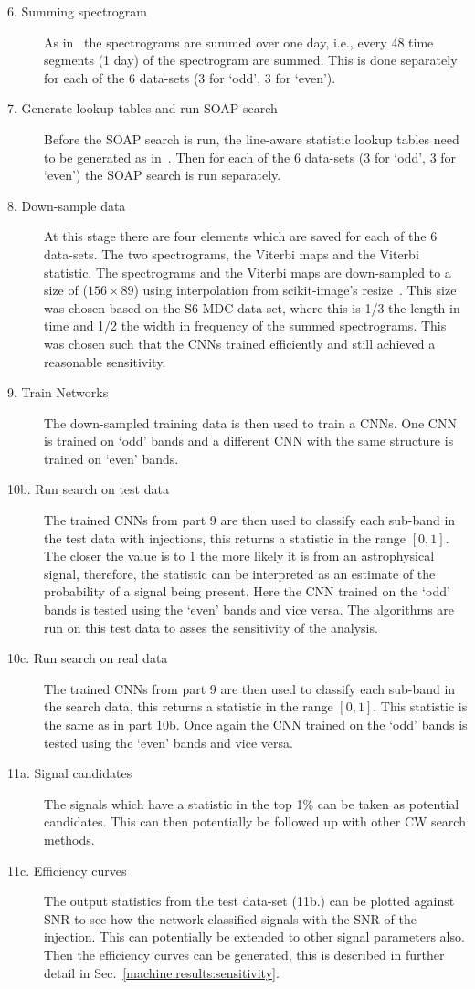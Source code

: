 \begin{description}
	\item[6. Summing spectrogram] As in~\cite{bayley2019SOAPGeneralised} the
	spectrograms are summed over one day, i.e., every 48 time segments (1 day) of
	the spectrogram are summed. This is done separately for each of the 6 data-sets
	(3 for `odd', 3 for `even'). 
	\item[7. Generate lookup tables and run SOAP search] Before the SOAP search is
	run, the line-aware statistic lookup tables need to be generated as
	in~\cite{bayley2019SOAPGeneralised}. Then for each of the 6 data-sets (3 for
	`odd', 3 for `even') the SOAP search is run separately. 
	\item[8. Down-sample data] At this stage there are four elements which are
	saved for each of the 6 data-sets. The two spectrograms, the Viterbi maps and
	the Viterbi statistic. The spectrograms and the Viterbi maps are down-sampled
	to a size of ($156\times 89$) using interpolation from scikit-image's
	resize~\cite{vanderwalt2014ScikitimageImage}. This size was chosen based on the
	S6 \gls{MDC} data-set, where this is 1/3 the length in time and 1/2 the width in
	frequency of the summed spectrograms. 
	This was chosen such that the \glspl{CNN} trained efficiently and still achieved a reasonable sensitivity. 
	\item[9. Train Networks] The down-sampled training data is then used to train a
	\glspl{CNN}. One \gls{CNN} is trained on `odd' bands and a different \gls{CNN} with
	the same structure is trained on `even' bands. 
	\item[10b. Run search on test data] The trained \glspl{CNN} from part 9 are then
	used to classify each sub-band in the test data with injections, this returns a
	statistic in the range $[0,1]$. The closer the value is to 1 the more likely it is from an astrophysical signal, therefore,  the statistic can be interpreted as an estimate of the probability of a signal being present. Here the \gls{CNN}
	trained on the `odd' bands is tested using the `even' bands and vice
	versa. The algorithms are run on this test data to asses the sensitivity of the analysis.
	\item[10c. Run search on real data] The trained \glspl{CNN} from part 9 are then
	used to classify each sub-band in the search data, this returns a statistic in the range
	$[0,1]$. This statistic is the same as in part 10b. 
	Once again the \gls{CNN} trained on the `odd' bands is tested using
	the `even' bands and vice versa.
	\item[11a. Signal candidates] The signals which have a statistic in the top
	1\% can be taken as potential candidates. 
	This can then potentially be followed up with other \gls{CW} search methods. 
	\item[11c. Efficiency curves] The output statistics from the test data-set (11b.) can
	be plotted against \gls{SNR} to see how the network classified signals with the
	\gls{SNR} of the injection. This can potentially be extended to other signal parameters also. 
	Then the efficiency curves can be generated, this is described in further detail in Sec.~\ref{machine:results:sensitivity}.
	
	
\end{description}
